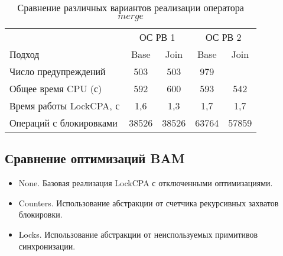 \begin{center}
  \begin{table}[h]\footnotesize \centering
  	\label{table-os-lock-merge}
    \caption{Сравнение различных вариантов реализации оператора $merge$}
    \begin{tabular}{ | l | c | c | c | c | }
      \hline
      		& 		\multicolumn{2}{|c|}{ОС РВ 1} & \multicolumn{2}{|c|}{ОС РВ 2}  \\
      Подход         					& Base 	& Join 	& Base 	& Join   	\\ \hline
      Число предупреждений				& 503   & 503   & 979   & \todo{918 ??}   	\\ 
  	  Общее время CPU (с) 				& 592 	& 600 	& 593   & 542     	\\ 
  \hspace{0.5cm} Время работы LockCPA, с & 1,6 	& 1,3 	& 1,7   & 1,7     	\\ \hline
   	  Операций с блокировками			& 38526 & 38526 & 63764 & 57859      	\\ 
      \hline
    \end{tabular}
  \end{table}
\end{center}

\subsection{Сравнение оптимизаций BAM}

\begin{itemize}
\item None. Базовая реализация LockCPA с отключенными оптимизациями.
\item Counters. Использование абстракции от счетчика рекурсивных захватов блокировки.
\item Locks. Использование абстракции от неиспользуемых примитивов синхронизации.
\end{itemize}

